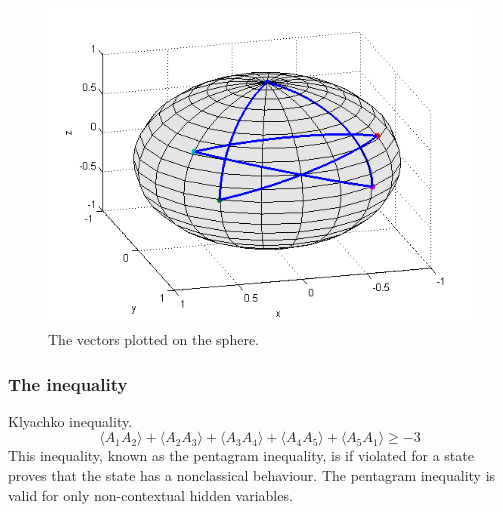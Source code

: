 \documentclass[•]{beamer}
\theoremstyle{remark}
\begin{document}
\begin{frame}
\begin{figure}[h!]
\begin{center}
\includegraphics[scale=0.6]{penta1.png}
\caption{The vectors plotted on the sphere.}
\end{center}
\end{figure}
\end{frame}

\begin{frame}[shrink=10]\frametitle{The inequality}
\begin{block}

Klyachko inequality.
\begin{equation*} 
\langle A_1 A_2 \rangle + \langle A_2 A_3 \rangle + \langle A_3 A_4 \rangle + \langle A_4 A_5 \rangle +
\langle A_5 A_1 \rangle \geq -3
\end{equation*}
This inequality, known as the pentagram inequality, is if violated for a state proves that the state has a nonclassical behaviour. The pentagram inequality is valid for only non-contextual hidden variables.
\end{block}
\end{frame}
\end{document}
